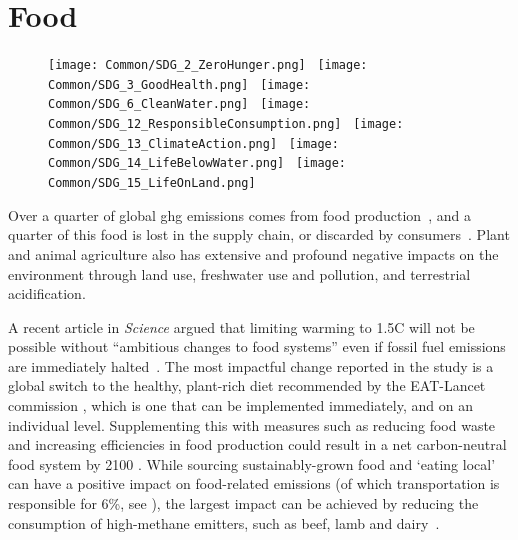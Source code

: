 \documentclass[../SustainableHEP.tex]{subfiles}
\begin{document}
\RaggedRight
\sloppy
\newpage


\section{Food}
\label{sec:Food}

\begin{figure}
\texttt{[image: Common/SDG\_2\_ZeroHunger.png]}~%
\texttt{[image: Common/SDG\_3\_GoodHealth.png]}~%
\texttt{[image: Common/SDG\_6\_CleanWater.png]}~%
\texttt{[image: Common/SDG\_12\_ResponsibleConsumption.png]}~%
\texttt{[image: Common/SDG\_13\_ClimateAction.png]}~%
\texttt{[image: Common/SDG\_14\_LifeBelowWater.png]}~%
\texttt{[image: Common/SDG\_15\_LifeOnLand.png]}
\end{figure}


\exSum

\noindent Over a quarter of global \acrshort{ghg} emissions comes from food production~\cite{USEPA}, and a quarter of this food is lost in the supply chain, or discarded by consumers~\cite{Searchinger2018}.  Plant and animal agriculture also has extensive and profound negative impacts on the environment through land use, freshwater use and pollution, and terrestrial acidification. 

A recent article in \textit{Science} argued that limiting warming to 1.5\degree C will not be possible without ``ambitious changes to food systems'' even if fossil fuel emissions are immediately halted~\cite{Clark370}.  The most impactful change reported in the study is a global switch to the healthy, plant-rich diet recommended by the EAT-Lancet commission \cite{WILLETT2019447}, which is one that can be implemented immediately, and on an individual level.  Supplementing this with measures such as reducing food waste and increasing efficiencies in food production could result in a net carbon-neutral food system by 2100 \cite{Clark370}.
While sourcing sustainably-grown food and `eating local' can have a positive impact on food-related emissions (of which transportation is responsible for 6\%, see ), the largest impact can be achieved by reducing the consumption of high-methane emitters, such as beef, lamb and dairy~\cite{PooreNemecek2018,OWID-Sustainable,OWID-Local}.
\end{document}
